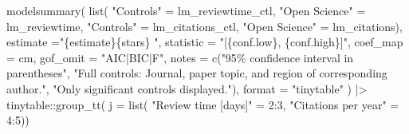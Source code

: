 \documentclass[
  authoryear,
  review,
  3p]{elsarticle}
\newenvironment{Shaded}{\begin{snugshade}}{\end{snugshade}}
\newcommand{\AttributeTok}[1]{\textcolor[rgb]{0.40,0.45,0.13}{#1}}
\newcommand{\DecValTok}[1]{\textcolor[rgb]{0.68,0.00,0.00}{#1}}
\newcommand{\FunctionTok}[1]{\textcolor[rgb]{0.28,0.35,0.67}{#1}}
\newcommand{\NormalTok}[1]{\textcolor[rgb]{0.00,0.23,0.31}{#1}}
\newcommand{\OtherTok}[1]{\textcolor[rgb]{0.00,0.23,0.31}{#1}}
\newcommand{\SpecialCharTok}[1]{\textcolor[rgb]{0.37,0.37,0.37}{#1}}
\newcommand{\StringTok}[1]{\textcolor[rgb]{0.13,0.47,0.30}{#1}}
\begin{document}
\begin{Shaded}
\begin{Highlighting}[]
\FunctionTok{modelsummary}\NormalTok{(}
  \FunctionTok{list}\NormalTok{(}
    \StringTok{"Controls"} \OtherTok{=}\NormalTok{ lm\_reviewtime\_ctl, }
    \StringTok{"Open Science"} \OtherTok{=}\NormalTok{ lm\_reviewtime, }
    \StringTok{"Controls"} \OtherTok{=}\NormalTok{ lm\_citations\_ctl,}
    \StringTok{"Open Science"} \OtherTok{=}\NormalTok{ lm\_citations),}
  \AttributeTok{estimate =}\StringTok{"\{estimate\}\{stars\} "}\NormalTok{,}
  \AttributeTok{statistic =} \StringTok{"[\{conf.low\}, \{conf.high\}]"}\NormalTok{,}
  \AttributeTok{coef\_map =}\NormalTok{ cm,}
  \AttributeTok{gof\_omit =} \StringTok{"AIC|BIC|F"}\NormalTok{,}
  \AttributeTok{notes =} \FunctionTok{c}\NormalTok{(}\StringTok{"95\% confidence interval in parentheses"}\NormalTok{, }
  \StringTok{"Full controls: Journal, paper topic, and region of corresponding author."}\NormalTok{, }
  \StringTok{"Only significant controls displayed."}\NormalTok{),}
  \AttributeTok{format =} \StringTok{"tinytable"}
\NormalTok{)  }\SpecialCharTok{|\textgreater{}}
\NormalTok{  tinytable}\SpecialCharTok{::}\FunctionTok{group\_tt}\NormalTok{( }\AttributeTok{j =} \FunctionTok{list}\NormalTok{( }\StringTok{"Review time [days]"} \OtherTok{=} \DecValTok{2}\SpecialCharTok{:}\DecValTok{3}\NormalTok{, }\StringTok{"Citations per year"} \OtherTok{=} \DecValTok{4}\SpecialCharTok{:}\DecValTok{5}\NormalTok{))}
\end{Highlighting}
\end{Shaded}
\end{document}
